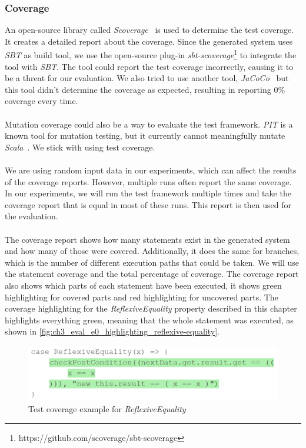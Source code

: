 \subsubsection{Coverage}
An open-source library called \textit{Scoverage}~\cite{siteScoverage2017} is used to determine the test coverage. It creates a detailed report about the coverage. Since the generated system uses
\textit{SBT} as build tool, we use the open-source plug-in
\textit{sbt-scoverage}\footnote{https://github.com/scoverage/sbt-scoverage} to
integrate the tool with \textit{SBT}. The tool could report the test coverage incorrectly, causing it to be a threat for our evaluation. We also tried to use another tool, \textit{JaCoCo}~\cite{siteJacoco2017} but this tool didn't determine the coverage as expected, resulting in reporting 0\% coverage every time.\\
\\
Mutation coverage could also be a way to evaluate the test framework. \textit{PIT} is a known tool for mutation testing, but it currently cannot meaningfully mutate \textit{Scala}~\cite{siteSbtPit2017}. We stick with using test coverage.\\
\\
We are using random input data in our experiments, which can affect the results of the coverage reports. However, multiple runs often report the same coverage. In our experiments, we will run the test framework multiple times and take the coverage report that is equal in most of these runs. This report is then used for the evaluation.\\
\\
The coverage report shows how many statements exist in the generated system and
how many of those were covered. Additionally, it does the same for branches,
which is the number of different execution paths that could be taken. We will
use the statement coverage and the total percentage
of coverage. The coverage report also shows which parts of each statement have
been executed, it shows green highlighting for covered parts and red
highlighting for uncovered parts. The coverage highlighting for the
\textit{ReflexiveEquality} property described in this chapter highlights
everything green, meaning that the whole statement was executed, as shown in
\autoref{fig:ch3_eval_e0_highlighting_reflexive-equality}.
\begin{figure}[!ht]
	\includegraphics[width=\linewidth]{figures/e0_coverage_property_sample}
\caption{Test coverage example for \textit{ReflexiveEquality}}
\label{fig:ch3_eval_e0_highlighting_reflexive-equality}
\centering
\end{figure}

